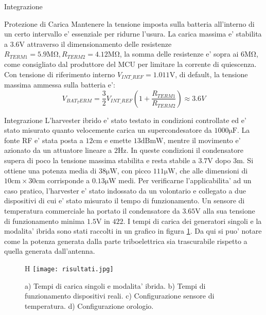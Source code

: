 \begin{section}{Integrazione}
    \begin{subsection}{Protezione di Carica}
        Mantenere la tensione imposta sulla batteria all'interno di un certo intervallo e' essenziale per ridurne l'usura. La carica massima e' stabilita a \(3.6\mathrm{V}\) attraverso il dimensionamento delle resistenze \(R_{TERM1}=5.9\mathrm{M\Omega},R_{TERM2}=4.12\mathrm{M\Omega}\), la somma delle resistenze e' sopra ai \(6\mathrm{M\Omega}\), come consigliato dal produttore del MCU per limitare la corrente di quiescenza. {\color{red}Con tensione di riferimento interno \(V_{INT\_REF}=1.011\mathrm{V}\), di default}, la tensione massima ammessa sulla batteria e': 
        \begin{equation*}
            V_{BAT_TERM} = \frac{3}{2}V_{INT\_REF}\left(1+\frac{R_{TERM1}}{R_{TERM2}}\right) \approx 3.6V
        \end{equation*}
    \end{subsection}

    \begin{subsection}{Integrazione}
        L'harvester ibrido e' stato testato in condizioni controllate ed e' stato misurato quanto velocemente carica un supercondesatore da \(1000\mathrm{\mu F}\). La fonte RF e' stata posta a \(12\mathrm{cm}\) e emette \(13\mathrm{dBmW}\), mentre il movimento e' azionato da un attuatore lineare a \(2\mathrm{Hz}\). In queste condizioni il condensatore supera di poco la tensione massima stabilita e resta stabile a \(3.7\mathrm{V}\) dopo \(3\mathrm{m}\). Si ottiene una potenza media di \(38\mathrm{\mu W}\), con picco \(111\mathrm{\mu W}\), che alle dimensioni di \(10\mathrm{cm}\times30\mathrm{cm}\) corrisponde a \(0.13\mathrm{\mu W}\) medi. Per verificarne l'applicabilita' ad un caso pratico, l'harvester e' stato indossato da un volontario e collegato a due dispositivi di cui e' stato misurato il tempo di funzionamento. Un sensore di temperatura commerciale ha portato il condensatore da \(3.65\mathrm{V}\) alla sua tensione di funzionamento minima \(1.5\mathrm{V}\) in \(42\mathrm{2}\).
        I tempi di carica dei generatori singoli e la modalita' ibrida sono stati raccolti in un grafico in figura \ref{fig:risultati}. Da qui si puo' notare come la potenza generata dalla parte triboelettrica sia trascurabile rispetto a quella generata dall'antenna.

        \begin{figure}{H}
            \texttt{[image: risultati.jpg]}
            \centering
            \caption{a) Tempi di carica singoli e modalita' ibrida. b) Tempi di funzionamento dispositivi reali. c) Configurazione sensore di temperatura. d) Configurazione orologio. \cite{kouWearableAllFabricHybrid2024}}
            \label{fig:risultati}
        \end{figure}


\end{subsection}
\end{section}
